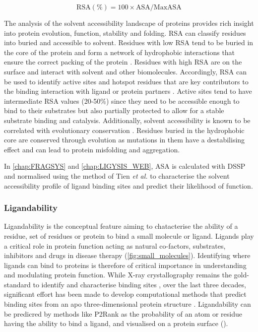 \begin{equation}
\text{RSA} (\%) = 100 \times \text{ASA}/\text{MaxASA}
\label{eq:RSA}
\end{equation}

\vspace{-13pt} %

The analysis of the solvent accessibility landscape of proteins provides rich insight into protein evolution, function, stability and folding. RSA can classify residues into buried and accessible to solvent. Residues with low RSA tend to be buried in the core of the protein and form a network of hydrophobic interactions that ensure the correct packing of the protein \cite{DILL_1990_FOLDING}. Residues with high RSA are on the surface and interact with solvent and other biomolecules. Accordingly, RSA can be used to identify active sites and hotspot residues that are key contributors to the binding interaction with ligand or protein partners \cite{JONES_1997_PROTINTERS}. Active sites tend to have intermediate RSA values (20-50\%) since they need to be accessible enough to bind to their substrates but also partially protected to allow for a stable substrate binding and catalysis. Additionally, solvent accessibility is known to be correlated with evolutionary conservation \cite{GOLDMAN_1998_SS_RSA_EVO}. Residues buried in the hydrophobic core are conserved through evolution as mutations in them have a destabilising effect and can lead to protein misfolding and aggregation.

In \autoref{chap:FRAGSYS} and \autoref{chap:LIGYSIS_WEB}, ASA is calculated with DSSP \cite{KABSCH_1983_DSSP} and normalised using the method of Tien \textit{et al.} \cite{TIEN_2013_RSA} to characterise the solvent accessibility profile of ligand binding sites and predict their likelihood of function.

\subsubsection{Ligandability}

Ligandability is the conceptual feature aiming to chatacterise the ability of a residue, set of residues or protein to bind a small molecule or ligand. Ligands play a critical role in protein function acting as natural co-factors, substrates, inhibitors and drugs in disease therapy (\autoref{fig:small_molecules}). Identifying where ligands can bind to proteins is therefore of critical importance in understanding and modulating protein function. While X-ray crystallography remains the gold-standard to identify and characterise binding sites \cite{REES_2004_FBLD}, over the last three decades, significant effort has been made to develop computational methods that predict binding sites from an apo three-dimensional protein structure \cite{VOLKAMER_2010_TOPOLOGY}. Ligandability can be predicred by methods like P2Rank \cite{KRIVAK_2018_P2RANK} as the probability of an atom or residue having the ability to bind a ligand, and visualised on a protein surface ().


